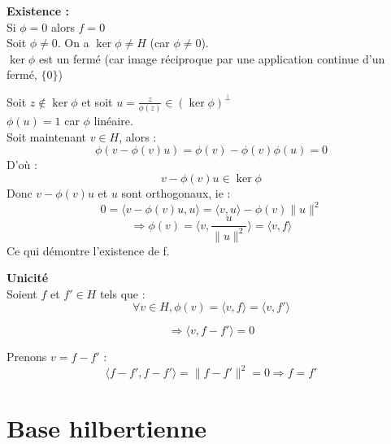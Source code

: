 
\begin{dem}
	\textbf{Existence :}\\
	Si $\phi=0$ alors $f=0$\\
	Soit $\phi\neq 0$. On a $\ker \phi \neq H$ (car $\phi \neq 0$). \\
	$\ker \phi$ est un fermé (car image réciproque par une application continue d'un fermé, $\{0\}$)

	\bigskip
	Soit $z\not\in \ker \phi$ et soit $u=\frac{z}{\phi(z)}\in\left(\ker\phi\right)^{\perp}$\\
	$\phi(u)=1$ car $\phi$ linéaire.\\
	
	\bigskip
	Soit maintenant $v\in H$, alors :
	\[\phi(v-\phi(v)u)=\phi(v)-\phi(v)\phi(u)=0\]
	D'où :
	\[v-\phi(v)u\in\ker \phi\]
	Donc $v-\phi(v)u$ et $u$ sont orthogonaux, ie :
	\[0=\langle v-\phi(v)u, u\rangle=\langle v,u\rangle -\phi(v)\|u\|^2\]
	\[\Rightarrow \phi(v)=\langle v,\frac{u}{\|u\|^2}\rangle = \langle v,f\rangle\]
	Ce qui démontre l'existence de f.

	\textbf{Unicité}\\
	Soient $f$ et $f'\in H$ tels que :
	\[\forall v\in H, \phi(v)=\langle v,f\rangle=\langle v,f'\rangle\]

	\[\Rightarrow \langle v,f-f'\rangle =0\]

	Prenons $v=f-f'$ :
	\[\langle f-f', f-f'\rangle = \|f-f'\|^2 = 0 \Rightarrow f=f'\]
\end{dem}

\section{Base hilbertienne}



